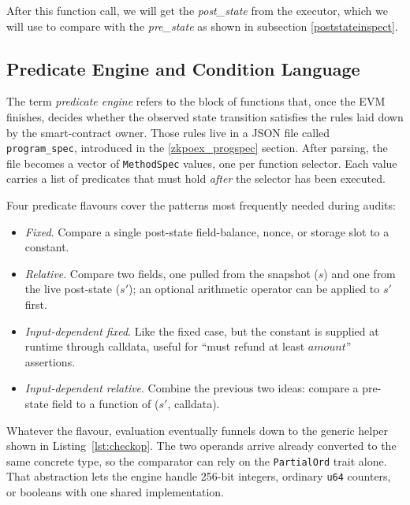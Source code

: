 After this function call, we will get the \textit{post\_state} from the executor, which we will use to compare with the \textit{pre\_state} as shown in subsection \ref{poststateinspect}.


\subsection{Predicate Engine and Condition Language} \label{predicate_lan}

The term \textit{predicate engine} refers to the block of functions that, once
the EVM finishes, decides whether the observed state transition satisfies the
rules laid down by the smart-contract owner. Those rules live in a JSON file
called \texttt{program\_spec}, introduced in the \ref{zkpoex_progspec} section.  After parsing, the file becomes a vector of \texttt{MethodSpec} values, one per function selector.  Each value carries a list of predicates that must hold \textit{after} the selector has been executed.

Four predicate flavours cover the patterns most frequently needed during
audits:

\begin{itemize}
  \item \textit{Fixed}. Compare a single post-state field-balance, nonce, or 
        storage slot to a constant.
  \item \textit{Relative}. Compare two fields, one pulled from the snapshot
        (\(s\)) and one from the live post-state (\(s'\)); an optional
        arithmetic operator can be applied to \(s'\) first.
  \item \textit{Input-dependent fixed}. Like the fixed case, but the constant is
        supplied at runtime through calldata, useful for “must refund at least
        \(\mathit{amount}\)” assertions.
  \item \textit{Input-dependent relative}. Combine the previous two ideas:
        compare a pre-state field to a function of (\(s'\), calldata).
\end{itemize}

Whatever the flavour, evaluation eventually funnels down to the generic helper
shown in Listing~\ref{lst:checkop}. The two operands arrive already
converted to the same concrete type, so the comparator can rely on the
\texttt{PartialOrd} trait alone.  That abstraction lets the engine handle
256-bit integers, ordinary \texttt{u64} counters, or booleans with one shared
implementation.

